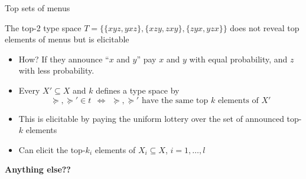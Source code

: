 \begin{frame}{Top sets of menus}{}

The top-2 type space $T=\{ \{xyz, yxz\}, \{xzy, zxy\}, \{zyx, yzx\} \}$ does not reveal top elements of menus but is elicitable

\pause

\bigskip


\begin{itemize}
\item How? If they announce ``$x$ and $y$'' pay $x$ and $y$ with equal probability, and $z$ with less probability.

\bigskip

\item Every $X'\subseteq X$ and $k$ defines a type space by
$$\succeq,\succeq'\in t ~~ \Longleftrightarrow ~~ \succeq,\succeq'\text{ have the same top }k\text{ elements of }X'$$

\medskip

\item This is elicitable by paying the uniform lottery over the set of announced top-$k$ elements

\bigskip

\item Can elicit the top-$k_i$ elements of $X_i\subseteq X$, $i=1,\ldots,l$

\end{itemize}

\pause

\bigskip

\textbf{Anything else??}

\end{frame}

%
%
%
%
%
%
%
%
%
%
%
%
%
%
%

